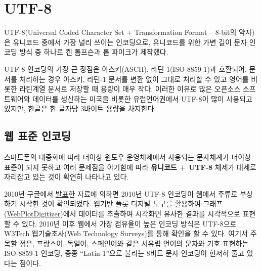 \documentclass[
  letterpaper,
]{book}
\begin{document}
\hypertarget{utf-8}{%
\section{UTF-8}\label{utf-8}}

UTF-8(Universal Coded Character Set + Transformation Format -- 8-bit의
약자)은 유니코드 중에서 가장 널리 쓰이는 인코딩으로, 유니코드를 위한
가변 길이 문자 인코딩 방식 중 하나로 켄 톰프슨과 롭 파이크가 제작했다.

UTF-8 인코딩의 가장 큰 장점은 아스키(ASCII), 라틴-1(ISO-8859-1)과
호환되어, 문서를 처리하는 경우 아스키, 라틴-1 문서를 변환 없이 그대로
처리할 수 있고 영어를 비롯한 라틴계열 문서로 저장할 때 용량이 매우 작다.
이러한 이유로 많은 오픈소스 소프트웨어와 데이터를 생산하는 미국을 비롯한
유럽언어권에서 UTF-8이 많이 사용되고 있지만, 한글은 한 글자당 3바이트
용량을 차지한다.

\hypertarget{uxc6f9-uxd45cuxc900-uxc778uxcf54uxb529}{%
\subsection{웹 표준
인코딩}\label{uxc6f9-uxd45cuxc900-uxc778uxcf54uxb529}}

스마트폰의 대중화에 따라 더이상 윈도우 운영체제에서 사용되는 문자체계가
더이상 표준이 되지 못하고 여러 문제점을 야기함에 따라 \textbf{유니코드 +
UTF-8} 체제가 대세로 자리잡고 있는 것이 확연히 나타나고 있다.

2010년 구글에서
\href{https://googleblog.blogspot.com/2010/01/unicode-nearing-50-of-web.html}{발표}한
자료에 의하면 2010년 UTF-8 인코딩이 웹에서 주류로 부상하기 시작한 것이
확인되었다. \autocite{unicode2010} 웹기반 플롯 디지털 도구를 활용하여
그래프(\href{https://apps.automeris.io/wpd/}{WebPlotDigitizer})에서
데이터를 추출하여 시각화면 유사한 결과를 시각적으로 표현할 수 있다.
2010년 이후 웹에서 가장 점유율이 높은 인코딩 방식은 UTF-8으로 W3Tech
웹기술조사(Web Technology Surveys)를 통해 확인을 할 수 있다. 여기서
주목할 점은, 프랑스어, 독일어, 스페인어와 같은 서유럽 언어의 문자와 기호
표현하는 ISO-8859-1 인코딩, 종종 ``Latin-1''으로 불리는 8비트 문자
인코딩이 현저히 줄고 있다는 점이다.
\end{document}
